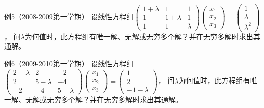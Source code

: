 \begin{frame}\ft{\subsecname}
  \begin{scriptsize}
    \begin{exampleblock}{例5（2008-2009第一学期）}
      设线性方程组$\left(
      \begin{array}{ccc}
        1+\lambda&1&1\\
        1&1+\lambda&1\\
        1&1&\lambda
      \end{array}
      \right)\left(
      \begin{array}{c}
        x_1\\x_2\\x_3
      \end{array}
      \right)=\left(
      \begin{array}{c}
        1\\\lambda\\\lambda^2
      \end{array}
      \right)$，
      问$\lambda$为何值时，此方程组有唯一解、无解或无穷多个解？并在无穷多解时求出其通解。
    \end{exampleblock}
    \begin{exampleblock}{例6（2009-2010第一学期）}
      设线性方程组$\left(
      \begin{array}{ccc}
        2-\lambda&2&-2\\
        2&5-\lambda&-4\\
        -2&-4&5-\lambda
      \end{array}
      \right)\left(
      \begin{array}{c}
        x_1\\x_2\\x_3
      \end{array}
      \right)=\left(
      \begin{array}{c}
        1\\2 \\-1-\lambda
      \end{array}
      \right)$，
      问$\lambda$为何值时，此方程组有唯一解、无解或无穷多个解？并在无穷多解时求出其通解。
    \end{exampleblock}
  \end{scriptsize}
\end{frame}






